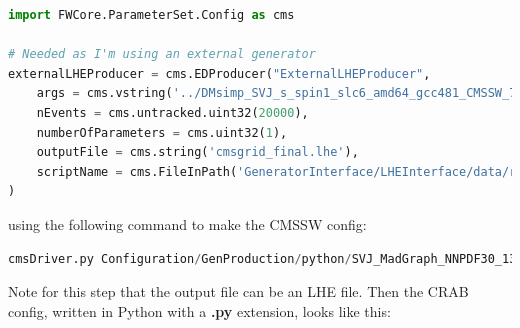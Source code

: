 \begin{lstlisting}[belowskip=-0.7cm, language=Python, numbers=none]
import FWCore.ParameterSet.Config as cms

# Needed as I'm using an external generator
externalLHEProducer = cms.EDProducer("ExternalLHEProducer",
    args = cms.vstring('../DMsimp_SVJ_s_spin1_slc6_amd64_gcc481_CMSSW_7_1_30_tarball.tar.xz'),
    nEvents = cms.untracked.uint32(20000),
    numberOfParameters = cms.uint32(1),
    outputFile = cms.string('cmsgrid_final.lhe'),
    scriptName = cms.FileInPath('GeneratorInterface/LHEInterface/data/run_generic_tarball_cvmfs.sh')
)
\end{lstlisting}

using the following command to make the CMSSW config:

\begin{lstlisting}[belowskip=-0.7cm, language=Python, numbers=none]
cmsDriver.py Configuration/GenProduction/python/SVJ_MadGraph_NNPDF30_13TeV_s_spin1_LHE_frag.py --fileout file:DMsimp_SVJ_s_MadGraph_NNPDF30_13TeV_LHE.root --mc --eventcontent LHE --datatier LHE --conditions MCRUN2_71_V1::All -s LHE --python_filename DMsimp_SVJ_s_MadGraph_NNPDF_13TeV_LHE.py --no_exec --customise Configuration/DataProcessing/Utils.addMonitoring -n 20000
\end{lstlisting}

Note for this step that the output file can be an LHE file. Then the CRAB config, written in Python with a \textbf{.py} extension, looks like this:


